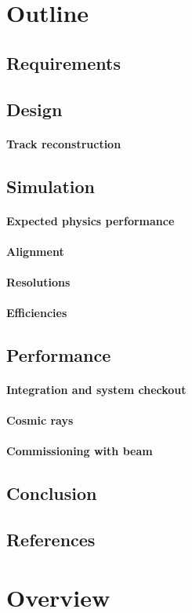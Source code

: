 \section{Outline}
\subsection{Requirements} 
\subsection{Design}
\paragraph{Track reconstruction}
\subsection{Simulation}
\paragraph{Expected physics performance}
\paragraph{Alignment}
\paragraph{Resolutions}
\paragraph{Efficiencies}
\subsection{Performance}
\paragraph{Integration and system checkout}
\paragraph{Cosmic rays}
\paragraph{Commissioning with beam}
\subsection{Conclusion}
\subsection{References}

\section{Overview}

